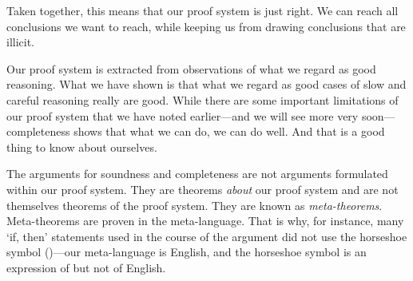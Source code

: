 Taken together, this means that our proof system is just right. We can reach all 
conclusions we want to reach, while keeping us from drawing conclusions that are 
illicit. 

Our proof system is extracted from observations of what we regard as  good 
reasoning.  What we have shown is that what we regard as good cases of slow and 
careful reasoning really are good. While there are some important limitations of 
our proof system that we have noted earlier---and we will see more very
soon---completeness shows that what we can do, we can do well.  And that is a 
good thing to know about ourselves. 

The arguments for soundness and completeness are not arguments formulated within 
our proof system. They are theorems \emph{about} our proof system and are not 
themselves theorems of the proof system. They are known as \emph{meta-theorems}.  
Meta-theorems are proven in the meta-language. That is why, for instance,  many 
`if, then' statements used in the course of the argument did not use the 
horseshoe symbol (\p{\limplies})---our meta-language is English, and the 
horseshoe symbol is an expression of \lL{} but not of English. 


\flushbottom
{}

 


